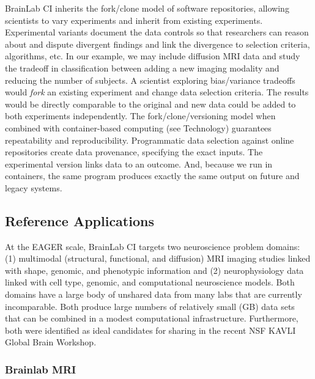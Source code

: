 BrainLab CI inherits the fork/clone model of software repositories, allowing scientists to vary experiments and inherit from existing experiments. Experimental variants document the data controls so that researchers can reason about and dispute divergent findings and link the divergence to selection criteria, algorithms, etc. In our example, we may include diffusion MRI data and study the tradeoff in classification between adding a new imaging modality and reducing the number of subjects. A scientist exploring bias/variance tradeoffs would {\em fork} an existing experiment and change data selection criteria. The results would be directly comparable to the original and new data could be added to both experiments independently.
The fork/clone/versioning model when combined with container-based computing (see Technology) guarantees repeatability and reproducibility. 
Programmatic data selection against online repositories create data provenance, specifying the exact inputs.  The experimental version links data to an outcome.  And, because we run in containers, the same program produces exactly the same output on future and legacy systems.

\subsection{Reference Applications}
\label{sec:apps}

At the EAGER scale, BrainLab CI targets two neuroscience problem domains: (1) multimodal (structural, functional, and diffusion) MRI imaging studies linked with shape, genomic, and phenotypic information and (2) neurophysiology data linked with cell type, genomic, and computational neuroscience models.  Both domains have a large body of unshared data from many labs that are currently incomparable.  Both produce large numbers of relatively small (GB) data sets that can be combined in a modest computational infrastructure.  Furthermore, both  were identified as ideal candidates for sharing in the recent NSF KAVLI Global Brain Workshop.

\subsubsection{Brainlab MRI}

